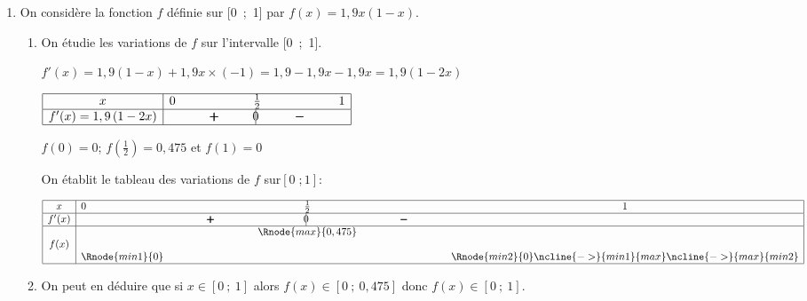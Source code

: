 \begin{enumerate}
\item On considère la fonction $f$ définie sur [0~;~1] par $f(x) = 1,9x(1 - x)$.
	\begin{enumerate}
		\item On étudie les variations de $f$ sur l'intervalle [0~;~1].
		
$f'(x)=1,9 \left (1-x\right ) + 1,9x\times(-1) = 1,9 - 1,9x -1,9x = 1,9\left (1-2x\right )$		
		
\begin{center}
\renewcommand{\arraystretch}{1.4}
\def\esp{\hspace*{1.5cm}}
$\begin{array}{|c | *{5}{c} |} 
\hline
x  & 0 & \esp & \frac{1}{2} & \esp  & 1 \\
\hline
f'(x) =1,9\left (1-2x\right )&  & \pmb{+} &  \vline\hspace{-2.7pt}{0} & \pmb{-} &\\
\hline
\end{array}$
\renewcommand{\arraystretch}{1}
\end{center}	

$f(0)=0$; $f\left (\frac{1}{2}\right) = 0,475$ et $f(1)=0$

On établit le tableau des variations de $f$ sur$[0\;; 1]$:

\begin{center}
{\renewcommand{\arraystretch}{1.3}
\def\esp{\hspace*{2.5cm}}%
\def\hauteur{0pt}%
$\begin{array}{|c|l*4{c}|}
\hline
x & 0  & \esp & \frac{1}{2} & \esp & 1 \\ 
\hline
f'(x) &  & \pmb{+} & \vline\hspace{-2.7pt}0 & \pmb{-} & \\ 
\hline
 & & & \Rnode{max}{0,475}  & & \\
f(x) &  & &  & & \rule{0pt}{\hauteur} \\ 
 &  \Rnode{min1}{0} &   &  &  &   \Rnode{min2}{0} \rule{0pt}{\hauteur}
 \ncline{->}{min1}{max} \ncline{->}{max}{min2} 
 \\
\hline
\end{array} $
}
\end{center}		
		
		\item On peut en déduire que si $x \in [0~;~1]$ alors $f(x) \in [0~;~0,475]$ donc $f(x) \in [0~;~1]$.
	\end{enumerate}	


\end{enumerate}
